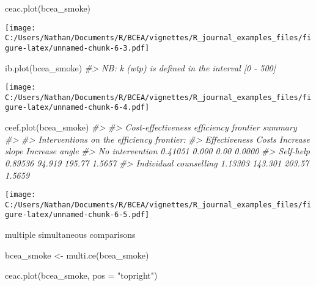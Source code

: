 \documentclass[
]{article}
\newenvironment{Shaded}{\begin{snugshade}}{\end{snugshade}}
\newcommand{\AttributeTok}[1]{\textcolor[rgb]{0.77,0.63,0.00}{#1}}
\newcommand{\CommentTok}[1]{\textcolor[rgb]{0.56,0.35,0.01}{\textit{#1}}}
\newcommand{\FunctionTok}[1]{\textcolor[rgb]{0.00,0.00,0.00}{#1}}
\newcommand{\NormalTok}[1]{#1}
\newcommand{\OtherTok}[1]{\textcolor[rgb]{0.56,0.35,0.01}{#1}}
\newcommand{\StringTok}[1]{\textcolor[rgb]{0.31,0.60,0.02}{#1}}
\begin{document}
\begin{Shaded}
\begin{Highlighting}[]

\FunctionTok{ceac.plot}\NormalTok{(bcea\_smoke)}
\end{Highlighting}
\end{Shaded}

\texttt{[image: C:/Users/Nathan/Documents/R/BCEA/vignettes/R\_journal\_examples\_files/figure-latex/unnamed-chunk-6-3.pdf]}

\begin{Shaded}
\begin{Highlighting}[]

\FunctionTok{ib.plot}\NormalTok{(bcea\_smoke)}
\CommentTok{\#\textgreater{} NB: k (wtp) is defined in the interval [0 {-} 500]}
\end{Highlighting}
\end{Shaded}

\texttt{[image: C:/Users/Nathan/Documents/R/BCEA/vignettes/R\_journal\_examples\_files/figure-latex/unnamed-chunk-6-4.pdf]}

\begin{Shaded}
\begin{Highlighting}[]

\FunctionTok{ceef.plot}\NormalTok{(bcea\_smoke)}
\CommentTok{\#\textgreater{} }
\CommentTok{\#\textgreater{} Cost{-}effectiveness efficiency frontier summary }
\CommentTok{\#\textgreater{} }
\CommentTok{\#\textgreater{} Interventions on the efficiency frontier:}
\CommentTok{\#\textgreater{}                        Effectiveness   Costs Increase slope Increase angle}
\CommentTok{\#\textgreater{} No intervention              0.41051   0.000           0.00         0.0000}
\CommentTok{\#\textgreater{} Self{-}help                    0.89536  94.919         195.77         1.5657}
\CommentTok{\#\textgreater{} Individual counselling       1.13303 143.301         203.57         1.5659}
\end{Highlighting}
\end{Shaded}

\texttt{[image: C:/Users/Nathan/Documents/R/BCEA/vignettes/R\_journal\_examples\_files/figure-latex/unnamed-chunk-6-5.pdf]}

multiple simultaneous comparisons

\begin{Shaded}
\begin{Highlighting}[]
\NormalTok{bcea\_smoke }\OtherTok{\textless{}{-}} \FunctionTok{multi.ce}\NormalTok{(bcea\_smoke)}

\FunctionTok{ceac.plot}\NormalTok{(bcea\_smoke, }\AttributeTok{pos =} \StringTok{"topright"}\NormalTok{)}
\end{Highlighting}
\end{Shaded}
\end{document}

